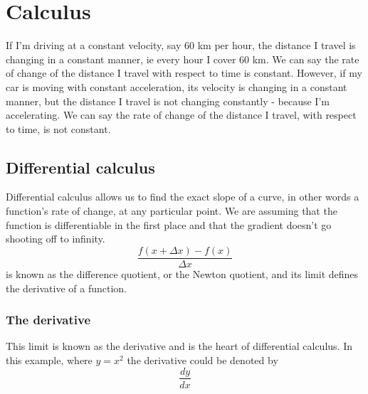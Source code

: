 \chapter{Calculus}

If I'm driving at a constant velocity, say 60 km per hour, the distance I travel is changing in a constant manner, ie every hour I cover 60 km. We can say the rate of change of the distance I travel with respect to time is constant. However, if my car is moving with constant acceleration, its velocity is changing in a constant manner, but the distance I travel is not changing constantly - because I'm accelerating. We can say the rate of change of the distance I travel, with respect to time, is not constant.

\section{Differential calculus}
Differential calculus allows us to find the exact slope of a curve, in other words a function's rate of change, at any particular point. We are assuming that the function is differentiable in the first place and that the gradient doesn't go shooting off to infinity.
\[
\frac{f(x + \Delta x) - f(x)}{\Delta x}
\]
is known as the difference quotient, or the Newton quotient, and its limit defines the derivative of a function.


\subsection{The derivative}
This limit is known as the derivative and is the heart of differential calculus. In this example, where $y = x^2$ the derivative could be denoted by
\[
\frac{dy}{dx}
\]

